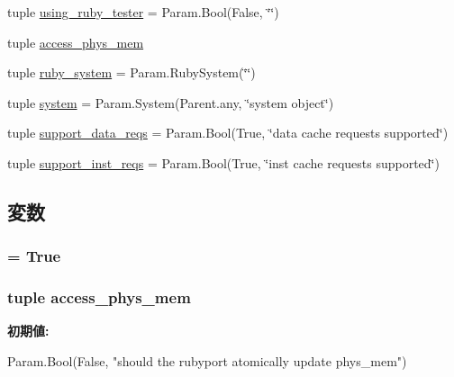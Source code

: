 \begin{DoxyCompactItemize}
\item 
tuple \hyperlink{classSequencer_1_1RubyPort_aa7e78589519412a13754bfc986aece09}{using\_\-ruby\_\-tester} = Param.Bool(False, \char`\"{}\char`\"{})
\item 
tuple \hyperlink{classSequencer_1_1RubyPort_a2508e7d3baa8674cfa2657be0bbd1361}{access\_\-phys\_\-mem}
\item 
tuple \hyperlink{classSequencer_1_1RubyPort_ad43d9de73a55aa43ab5023d7815d7286}{ruby\_\-system} = Param.RubySystem(\char`\"{}\char`\"{})
\item 
tuple \hyperlink{classSequencer_1_1RubyPort_ab737471139f5a296e5b26e8a0e1b0744}{system} = Param.System(Parent.any, \char`\"{}system object\char`\"{})
\item 
tuple \hyperlink{classSequencer_1_1RubyPort_aa05c4974d49163b7fb2ec88b78b62739}{support\_\-data\_\-reqs} = Param.Bool(True, \char`\"{}data cache requests supported\char`\"{})
\item 
tuple \hyperlink{classSequencer_1_1RubyPort_a312bbed96f73418127191c748163adcb}{support\_\-inst\_\-reqs} = Param.Bool(True, \char`\"{}inst cache requests supported\char`\"{})
\end{DoxyCompactItemize}


\subsection{変数}
\hypertarget{classSequencer_1_1RubyPort_a17fa61ac3806b481cafee5593b55e5d0}{
\subsubsection[{abstract}]{ = True}}
\label{classSequencer_1_1RubyPort_a17fa61ac3806b481cafee5593b55e5d0}
\hypertarget{classSequencer_1_1RubyPort_a2508e7d3baa8674cfa2657be0bbd1361}{
\subsubsection[{access\_\-phys\_\-mem}]{\setlength{\rightskip}{0pt plus 5cm}tuple {\bf access\_\-phys\_\-mem}}}
\label{classSequencer_1_1RubyPort_a2508e7d3baa8674cfa2657be0bbd1361}
{\bfseries 初期値:}
\begin{DoxyCode}
Param.Bool(False,
        "should the rubyport atomically update phys_mem")
\end{DoxyCode}


